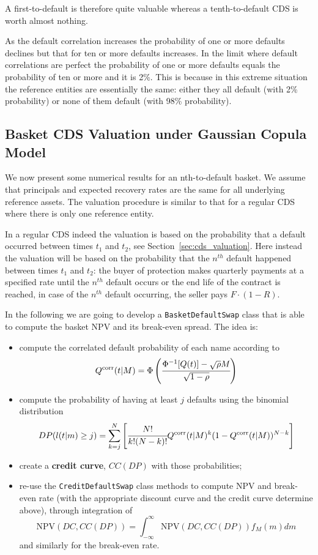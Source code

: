 A first-to-default is therefore quite valuable whereas a tenth-to-default CDS is worth almost nothing.

As the default correlation increases the probability of one or more defaults declines 
but that for ten or more defaults increases. In the limit where default correlations are perfect the probability of one or more defaults equals the probability of ten or more and it is 2\%. This is because in this extreme situation the reference entities are essentially the same: either they all default (with 2\% probability) or none of them default (with 98\% probability).

\subsection{Basket CDS Valuation under Gaussian Copula Model}
\label{basket-cds-valuation-under-market-standard-model}
We now present some numerical results for an nth-to-default basket.
We assume that principals and expected recovery rates are the same
for all underlying reference assets. The valuation procedure is similar
to that for a regular CDS where there is only one reference entity.

In a regular CDS indeed the valuation is based on the probability that a
default occurred between times \(t_1\) and \(t_2\), see Section~\ref{sec:cds_valuation}. Here instead the valuation will be based on the probability that the $n^{th}$ default happened between times \(t_1\) and \(t_2\):
the buyer of protection makes quarterly payments at a
specified rate until the $n^{th}$ default occurs or the end life
of the contract is reached,
in case of the $n^{th}$ default occurring, the seller pays
\(F\cdot(1-R)\). 

In the following we are going to develop a \texttt{BasketDefaultSwap} class that is able to compute the basket NPV and its break-even spread.
The idea is:
\begin{itemize}
\item compute the correlated default probability of each name according to 
\begin{equation}
Q^{\textrm{corr}}(t|M) = \Phi\left(\cfrac{\Phi^{-1}[Q(t)]-\sqrt{\rho} M}{\sqrt{1-\rho}}\right)
\end{equation}
\item compute the probability of having at least $j$ defaults using the binomial distribution
\begin{equation}
DP(l(t|m) \ge j) = \sum_{k=j}^{N}\left[  \cfrac{N!}{k!(N-k)!}Q^{\textrm{corr}}(t|M)^k(1-Q^{\textrm{corr}}(t|M))^{N-k}\right]
\end{equation}
\item create a \textbf{credit curve}, $CC(DP)$ with those probabilities;
\item re-use the \texttt{CreditDefaultSwap} class methods to compute NPV and break-even rate (with the appropriate discount curve and the credit curve determine above), through integration of
\begin{equation}
\mathrm{NPV}(DC, CC(DP)) = \int_{-\infty}^{\infty}{\mathrm{NPV}(DC, CC(DP)) f_M(m)dm} 
\end{equation}
and similarly for the break-even rate.
\end{itemize}

